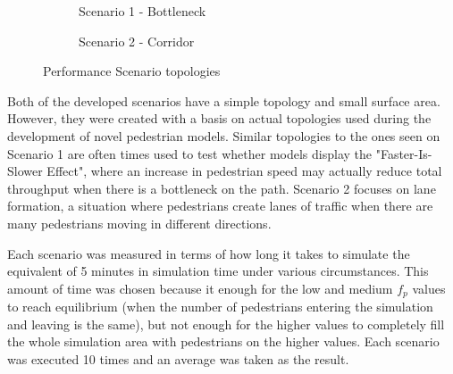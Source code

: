 \documentclass[twoside, 11pt]{article}
\begin{document}
\begin{figure}[h]
  \centering
  \begin{subfigure}{.33\textwidth}
    \centering
    
    \caption{Scenario 1 -  Bottleneck}
    \label{fig:sfig1}
  \end{subfigure}%
  \begin{subfigure}{.67\textwidth}
    \centering
    
    \caption{Scenario 2 - Corridor}
    \label{fig:sfig1}
  \end{subfigure}%
  \caption{Performance Scenario topologies}
  \label{fig:performace_scenario_topologies}
\end{figure}

Both of the developed scenarios have a simple topology and small surface area. However, they were created with a basis on actual topologies used during the development of novel pedestrian models. Similar topologies to the ones seen on Scenario 1 are often times used to test whether models display the "Faster-Is-Slower Effect", where an increase in pedestrian speed may actually reduce total throughput when there is a bottleneck on the path. Scenario 2 focuses on lane formation, a situation where pedestrians create lanes of traffic when there are many pedestrians moving in different directions.

Each scenario was measured in terms of how long it takes to simulate the equivalent of 5 minutes in simulation time under various circumstances. This amount of time was chosen because it enough for the low and medium $f_p$ values to reach equilibrium (when the number of pedestrians entering the simulation and leaving is the same), but not enough for the higher values to completely fill the whole simulation area with pedestrians on the higher values. Each scenario was executed 10 times and an average was taken as the result.

\end{document}
